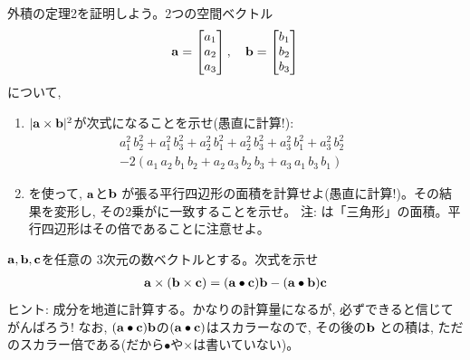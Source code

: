 \begin{exq}\label{exq:vector_3prod_area}
外積の定理2を証明しよう。2つの空間ベクトル
\begin{eqnarray}
{\bf a}=
\begin{bmatrix}
a_1\\
a_2\\
a_3\\
\end{bmatrix}
,\quad
{\bf b}=
\begin{bmatrix}
b_1\\
b_2\\
b_3\\
\end{bmatrix}
\end{eqnarray}
について, 
\begin{enumerate}
\item $|{\bf a}\times{\bf b}|^2$が次式になることを示せ(愚直に計算!):
\begin{eqnarray}
&&a_1^2\,b_2^2+a_1^2\,b_3^2+a_2^2\,b_1^2+a_2^2\,b_3^2+a_3^2\,b_1^2+a_3^2\,b_2^2\nonumber\\
&&-2(a_1\,a_2\,b_1\,b_2+a_2\,a_3\,b_2\,b_3+a_3\,a_1\,b_3\,b_1)\quad\quad\quad\quad
\label{eq:vector_3prod_area_component}
\end{eqnarray}
\item {}を使って, ${\bf a}$と${\bf b}$
が張る平行四辺形の面積を計算せよ(愚直に計算!)。その結果を変形し, 
その2乗がに一致することを示せ。
注: は「三角形」の面積。平行四辺形はその倍であることに注意せよ。
\end{enumerate}
\end{exq}\hv

\begin{exq}\label{q:univ_vector_3prod} ${\bf a}, {\bf b}, {\bf c}$を任意の
3次元の数ベクトルとする。次式を示せ
\begin{eqnarray}
{\bf a}\times({\bf b} \times {\bf c})=({\bf a}\bullet{\bf c}){\bf b}-({\bf a}\bullet{\bf b}){\bf c}
\end{eqnarray}
{\small ヒント: 成分を地道に計算する。かなりの計算量になるが, 必ずできると信じてがんばろう! なお, 
$({\bf a}\bullet{\bf c}){\bf b}$の$({\bf a}\bullet{\bf c})$はスカラーなので, その後の${\bf b}$
との積は, ただのスカラー倍である(だから$\bullet$や$\times$は書いていない)。}
\end{exq}
\hv


